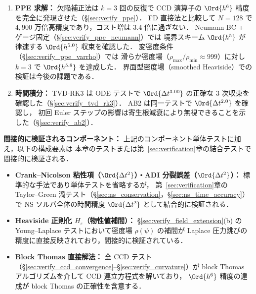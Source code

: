 \begin{enumerate}
  \item \textbf{PPE 求解：}
        欠陥補正法は $k=3$ 回の反復で CCD 演算子の $\Ord{h^6}$ 精度を完全に発現させた（§\ref{sec:verify_ppe}）．
        FD 直接法と比較して $N=128$ で $4{,}900$ 万倍高精度であり，コスト増は $3.4$ 倍に過ぎない．
        Neumann BC + ゲージ固定（§\ref{sec:verify_ppe_neumann}）では
        境界スキーム $\Ord{h^5}$ が律速する $\Ord{h^{5.0}}$ 収束を確認した．
        変密度条件（§\ref{sec:verify_ppe_varrho}）では
        滑らか密度場（$\rho_{\max}/\rho_{\min} \approx 999$）に対し
        $k = 3$ で $\Ord{h^{5.8}}$ を達成した．
        界面型密度場（smoothed Heaviside）での検証は今後の課題である．
  \item \textbf{時間積分：}
        TVD-RK3 は ODE テストで $\Ord{\Delta t^{3.00}}$ の正確な 3 次収束を確認した（§\ref{sec:verify_tvd_rk3}）．
        AB2 は同一テストで $\Ord{\Delta t^{2.0}}$ を確認し，
        初回 Euler ステップの影響は寄生根減衰により無視できることを示した（§\ref{sec:verify_ab2}）．
\end{enumerate}

\noindent\textbf{間接的に検証されるコンポーネント：}
上記のコンポーネント単体テストに加え，以下の構成要素は
本章のテストまたは第~\ref{sec:verification}章の結合テストで間接的に検証される．
\begin{itemize}[noitemsep]
  \item \textbf{Crank--Nicolson 粘性項（$\Ord{\Delta t^2}$）・ADI 分裂誤差（$\Ord{\Delta t^2}$）：}
        標準的な手法であり単体テストを省略するが，
        第~\ref{sec:verification}章の Taylor--Green 渦テスト（§\ref{sec:ns_conservation}，§\ref{sec:ns_time_accuracy}）で
        NS ソルバ全体の時間精度 $\Ord{\Delta t^2}$ として結合的に検証される．
  \item \textbf{Heaviside 正則化 $H_\varepsilon$（物性値補間）：}
        §\ref{sec:verify_field_extension}(b) の Young--Laplace テストにおいて密度場 $\rho(\psi)$ の補間が
        Laplace 圧力跳びの精度に直接反映されており，間接的に検証されている．
  \item \textbf{Block Thomas 直接解法：}
        全 CCD テスト（§\ref{sec:verify_ccd_convergence}--§\ref{sec:verify_curvature}）が
        block Thomas アルゴリズムを介して CCD 連立方程式を解いており，
        $\Ord{h^6}$ 精度の達成が block Thomas の正確性を含意する．
\end{itemize}

